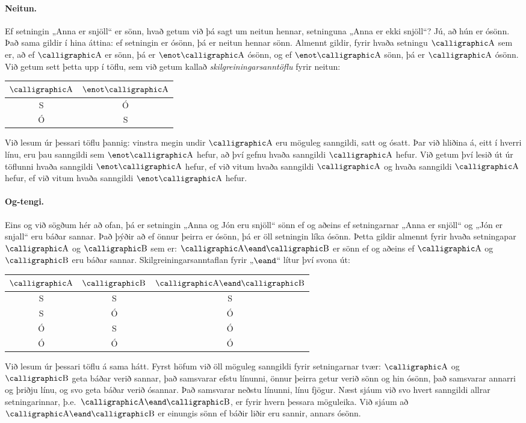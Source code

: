 \paragraph{Neitun.} Ef setningin „Anna er snjöll“ er sönn, hvað getum við þá sagt um neitun hennar, setninguna „Anna er ekki snjöll“? Jú, að hún er ósönn. Það sama gildir í hina áttina: ef setningin er ósönn, þá er neitun hennar sönn. Almennt gildir, fyrir hvaða setningu $\meta{A}$ sem er, að ef $\meta{A}$ er sönn, þá er $\enot \meta{A}$ ósönn, og ef $\enot \meta{A}$ sönn, þá er $\meta{A}$ ósönn. Við getum sett þetta upp í töflu, sem við getum kallað \emph{skilgreiningarsanntöflu} fyrir neitun:
\begin{center}
\begin{tabular}{c|c}
$\meta{A}$ & $\enot\meta{A}$\\
\hline
S & Ó\\
Ó & S 
\end{tabular}
\end{center}

Við lesum úr þessari töflu þannig: vinstra megin undir $\meta{A}$ eru möguleg sanngildi, satt og ósatt. Þar við hliðina á, eitt í hverri línu, eru þau sanngildi sem $\enot \meta{A}$ hefur, að því gefnu hvaða sanngildi $\meta{A}$ hefur. Við getum því lesið út úr töflunni hvaða sanngildi $\enot \meta{A}$ hefur, ef við vitum hvaða sanngildi $\meta{A}$ og hvaða sanngildi $\meta{A}$ hefur, ef við vitum hvaða sanngildi $\enot \meta{A}$ hefur. 

\paragraph{Og-tengi.} Eins og við sögðum hér að ofan, þá er setningin „Anna og Jón eru snjöll“ sönn ef og aðeins ef setningarnar „Anna er snjöll“ og „Jón er snjall“ eru báðar sannar. Það þýðir að ef önnur þeirra er ósönn, þá er öll setningin líka ósönn. Þetta gildir almennt fyrir hvaða setningapar $\meta{A}$ og $\meta{B}$ sem er: $\meta{A} \eand \meta{B}$ er sönn ef og aðeins ef $\meta{A}$ og $\meta{B}$ eru báðar sannar. Skilgreiningarsanntaflan fyrir „$\eand$“ lítur því svona út:

\begin{center}
\begin{tabular}{c c |c}
$\meta{A}$ & $\meta{B}$ & $\meta{A}\eand\meta{B}$\\
\hline
S & S & S\\
S & Ó & Ó\\
Ó & S & Ó\\
Ó & Ó & Ó
\end{tabular}
\end{center}
Við lesum úr þessari töflu á sama hátt. Fyrst höfum við öll möguleg sanngildi fyrir setningarnar tvær: $\meta{A}$ og $\meta{B}$ geta báðar verið sannar, það samsvarar efstu línunni, önnur þeirra getur verið sönn og hin ósönn, það samsvarar annarri og þriðju línu, og svo geta báðar verið ósannar. Það samsvarar neðstu línunni, línu fjögur. Næst sjáum við svo hvert sanngildi allrar setningarinnar, þ.e.\ $\meta{A} \eand \meta{B}$, er fyrir hvern þessara möguleika. Við sjáum að $\meta{A} \eand \meta{B}$ er einungis sönn ef báðir liðir eru sannir, annars ósönn.

